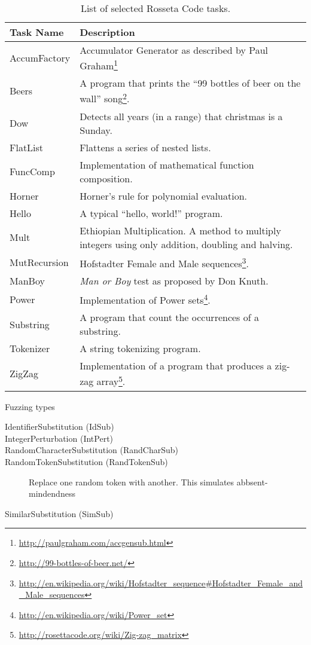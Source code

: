 \documentclass[10pt]{sigplanconf}
\begin{document}
\begin{table}
\begin{center}
\begin{tabular}{ l p{5cm}}
 \hline
Task Name & Description\\
\hline
AccumFactory & Accumulator Generator as described by Paul Graham\footnote{\url{http://paulgraham.com/accgensub.html}}\\
Beers & A program that prints the ``99 bottles of beer on the wall'' song\footnote{\url{http://99-bottles-of-beer.net/}}.\\
Dow & Detects all years (in a range) that christmas is a Sunday.\\
FlatList & Flattens a series of nested lists.\\
FuncComp & Implementation of mathematical function composition.\\
Horner & Horner's rule for polynomial evaluation.\\
Hello & A typical ``hello, world!'' program.\\
Mult & Ethiopian Multiplication. A method to multiply integers using only addition, doubling and halving.\\
MutRecursion & Hofstadter Female and Male sequences\footnote{\url{http://en.wikipedia.org/wiki/Hofstadter_sequence#Hofstadter_Female_and_Male_sequences}}.\\
ManBoy & \textit{Man or Boy} test as proposed by Don Knuth.\\
Power & Implementation of Power sets\footnote{\url{http://en.wikipedia.org/wiki/Power_set}}.\\
Substring & A program that count the occurrences of a substring.\\
Tokenizer & A string tokenizing program.\\
ZigZag & Implementation of a program that produces a zig-zag array\footnote{\url{http://rosettacode.org/wiki/Zig-zag_matrix}}.\\
\hline
\end{tabular}
\end{center}
\caption{List of selected Rosseta Code tasks.}
\label{tab:Tasks}
\end{table}

Fuzzing types

\begin{description}
	\item [IdentifierSubstitution (IdSub)]
	\item [IntegerPerturbation (IntPert)]
	\item [RandomCharacterSubstitution (RandCharSub)]
	\item [RandomTokenSubstitution (RandTokenSub)] Replace one random token with another. This simulates abbsent-mindendness

	\item [SimilarSubstitution (SimSub)]
\end{description}
\end{document}
